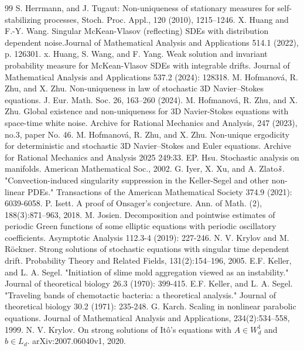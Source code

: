 \documentclass[10pt,a4paper]{amsart}
\numberwithin{equation}{section}
\begin{document}
\begin{thebibliography}{99}
 S. Herrmann, and J. Tugaut: Non-uniqueness of stationary measures for self-stabilizing processes, Stoch. Proc. Appl., 120 (2010), 1215–1246.
 X. Huang and F.-Y. Wang. Singular McKean-Vlasov (reflecting) SDEs with distribution dependent noise.Journal of Mathematical Analysis and Applications 514.1 (2022), p. 126301.
 x. Huang, S. Wang, and F. Yang. Weak solution and invariant probability measure for McKean-Vlasov SDEs with integrable drifts. Journal of Mathematical Analysis and Applications 537.2 (2024): 128318.
 M. Hofmanov\'a, R. Zhu, and X. Zhu. Non-uniqueness in law of stochastic 3D Navier–Stokes equations. J. Eur. Math. Soc. 26, 163–260 (2024).
 M. Hofmanov\'a, R. Zhu, and X. Zhu. Global existence and non-uniqueness for 3D Navier-Stokes equations with space-time white noise. Archive for Rational Mechanics and Analysis, 247 (2023), no.3, paper No. 46.
 M. Hofmanov\'a, R. Zhu, and X. Zhu. Non-unique ergodicity for deterministic and stochastic 3D Navier--Stokes and Euler equations. Archive for Rational Mechanics and Analysis 2025 249:33.
 EP. Hsu. Stochastic analysis on manifolds. American Mathematical Soc., 2002.
 G. Iyer, X. Xu, and A. Zlato$\rm \check s$. "Convection-induced singularity suppression in the Keller-Segel and other non-linear PDEs." Transactions of the American Mathematical Society 374.9 (2021): 6039-6058.
 P. Isett. A proof of Onsager’s conjecture. Ann. of Math. (2), 188(3):871–963, 2018.
 M. Josien. Decomposition and pointwise estimates of periodic Green functions of some elliptic equations with periodic oscillatory coefficients. Asymptotic Analysis 112.3-4 (2019): 227-246.
 N. V. Krylov and M. R\"ockner. Strong solutions of stochastic equations with singular time dependent drift. Probability Theory and Related Fields, 131(2):154–196, 2005.
 E.F. Keller, and L. A. Segel. "Initiation of slime mold aggregation viewed as an instability." Journal of theoretical biology 26.3 (1970): 399-415.
 E.F. Keller, and L. A. Segel. "Traveling bands of chemotactic bacteria: a theoretical analysis." Journal of theoretical biology 30.2 (1971): 235-248.
 G. Karch. Scaling in nonlinear parabolic equations. Journal of Mathematical Analysis and Applications, 234(2):534–558, 1999.
 N. V. Krylov. On strong solutions of It\^o’s equations with $A \in W^1_d$ and $b \in L_d$. arXiv:2007.06040v1, 2020.

\end{thebibliography}
\end{document}
